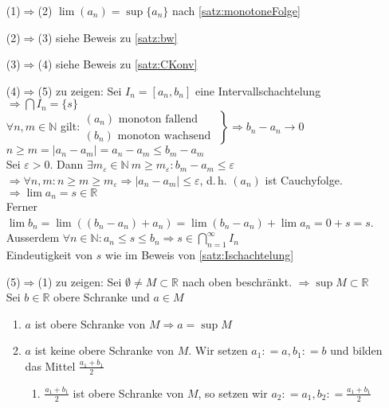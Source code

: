 \documentclass[ngerman,titlepage,twoside, parskip=half*]{scrreprt}
\newcommand*{\N}{\mathbb{N}}
\newcommand*{\R}{\mathbb{R}}
\theoremstyle{plain}
\theoremstyle{definition}
\theoremstyle{remark}
\newcommand*{\abs}[2][]{#1\lvert#2#1\rvert}
\newcommand*{\coloneqq}{\mathrel{\mathop:}=}
\begin{document}
\begin{itemize}
  \item[(1)$\Rightarrow$(2)] $\lim (a_n)=\sup \{a_n\}$ nach \autoref{satz:monotoneFolge}
  \item[(2)$\Rightarrow$(3)] siehe Beweis zu \autoref{satz:bw}
  \item[(3)$\Rightarrow$(4)] siehe Beweis zu \autoref{satz:CKonv}
  \item[(4)$\Rightarrow$(5)] zu zeigen: Sei $I_n=[a_n,b_n]$ eine Intervallschachtelung $\Rightarrow \bigcap I_n=\{s\}$\\
    $\forall n,m \in \N$ gilt:$\left.
    \begin{array}{lll}
      (a_n) \text{ monoton fallend }\\
      (b_n) \text{ monoton wachsend }
    \end{array}
    \right\} \Rightarrow b_n-a_n\rightarrow 0$\\
    $n\geq m =\abs{a_n-a_m}=a_n-a_m\leq b_m-a_m$\\
    Sei $\varepsilon>0$. Dann $\exists m_{\varepsilon} \in \N\ m\geq m_{\varepsilon}\colon b_m-a_m\leq \varepsilon$\\
    $\Rightarrow \forall n,m \colon n\geq m \geq m_{\varepsilon}\Rightarrow \abs{a_n-a_m}\leq \varepsilon$, d.\,h. $(a_n)$ ist
    Cauchyfolge.\\
    $\Rightarrow \lim a_n = s \in \R$\\
    Ferner $\lim b_n =\lim ((b_n-a_n)+a_n)=\lim (b_n-a_n)+\lim a_n = 0+s=s$. Ausserdem $\forall n \in \N \colon a_n\leq s\leq 
    b_n \Rightarrow s \in \bigcap_{n=1}^{\infty}I_n$\\
    Eindeutigkeit von $s$ wie im Beweis von \autoref{satz:Ischachtelung}
  \item[(5)$\Rightarrow$(1)] zu zeigen: Sei $\emptyset \neq M \subset \R$ nach oben beschränkt. $\Rightarrow \sup M 
    \subset \R$\\
    Sei $b \in \R$ obere Schranke und $a \in M$
    \begin{enumerate}[1. F{a}ll]
      \item $a$ ist obere Schranke von $M \Rightarrow a = \sup M$
      \item $a$ ist keine obere Schranke von $M$. Wir setzen $a_1\coloneqq a,
      b_1\coloneqq b$ und bilden das Mittel $\frac{a_1+b_1}{2}$
      \begin{enumerate}[{2}.1. F{a}ll]
        \item $\frac{a_1+b_1}{2}$ ist obere Schranke von $M$, so setzen wir
	$a_2\coloneqq a_1, b_2\coloneqq\frac{a_1+b_1}{2}$

\end{enumerate}
\end{enumerate}
\end{itemize}
\end{document}
